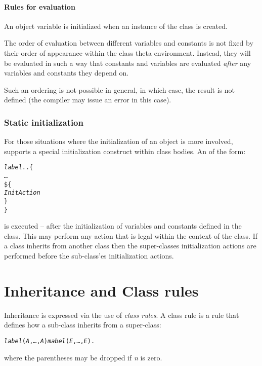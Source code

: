 \paragraph{Rules for evaluation}
An object variable is initialized when an instance of the class is created. 

The order of evaluation between different variables and constants is not fixed by their order of appearance within the class theta environment. Instead, they will be evaluated in such a way that constants and variables are evaluated \emph{after} any variables and constants they depend on.

Such an ordering is not possible in general, in which case, the result is not defined (the compiler may issue an error in this case).

\subsubsection{Static initialization}
\label{object:initialization}
For those situations where the initialization of an object is more involved, \go supports a special initialization construct within class bodies. An  of the form:
\begin{alltt}
\emph{label}..\{
  \ldots
  \$\{
    \emph{InitAction}
  \}
\}
\end{alltt}
is executed -- after the initialization of variables and constants defined in the class. This  may perform any action that is legal within the context of the class. If a class inherits from another class then the super-classes initialization actions are performed before the sub-class'es initialization actions.


\section{Inheritance and Class rules}
\label{object:class rule}

Inheritance is expressed via the use of \emph{class rules}. A class rule is a rule that defines how a sub-class inherits from a super-class:
\begin{alltt}
\emph{label}(\emph{A},\ldots,\emph{A\subn}) \classarrow \emph{mabel}(\emph{E},\ldots,\emph{E}).
\end{alltt}
where the parentheses may be dropped if \emph{n} is zero.

